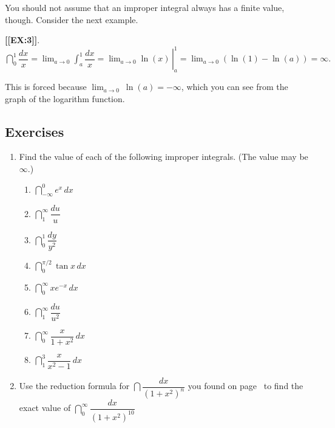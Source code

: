 You should not assume that an improper integral always has a finite value, though.
Consider the next example.





{\bf [[EX:3]]}. $\displaystyle \left. \dint_0^1 \dfrac{dx}{x} 
= \lim_{a \to 0} \int_a^1 \dfrac{dx}{x}
= \lim_{a \to 0} \ln(x) \,\right|_a^1
= \lim_{a \to 0} \left( \ln(1)-\ln(a) \right)
= \infty.
$





This is forced because ${\displaystyle \lim_{a \to 0} \ \ln(a) =
  -\infty}$, which you can see from the graph of the logarithm
function.

\subsection{Exercises}
\label{subsec:exercises}




\begin{enumerate}
\item Find the value of each of the following improper
integrals.  (The value may be $\infty$.)



  \begin{enumerate}
  \item $\dint_{-\infty}^0 e^x \, dx$


  \item $\dint_1^{\infty} \dfrac{du}{u}$



  \item $\dint_0^1 \dfrac{dy}{y^2}$


  \item $\dint_0^{\pi/2} \tan{x} \, dx$
	

  \item $\dint_0^{\infty} x e^{-x} \, dx$
	

  \item $\dint_1^{\infty} \dfrac{du}{u^2}$
	

  \item $\dint_0^{\infty} \dfrac{x}{1 + x^2} \, dx$
	 

  \item $\dint_1^3 \dfrac{x}{x^2 - 1}\, dx$
\mbox{}


\end{enumerate}
\item Use the reduction formula for $\dint \dfrac{dx}{(1+x^2)^n}$ you
found on page~\pageref{1plusx2} to find the exact value of
$\dint_0^{\infty} \dfrac{dx}{(1+x^2)^{10}}$

\end{enumerate}
